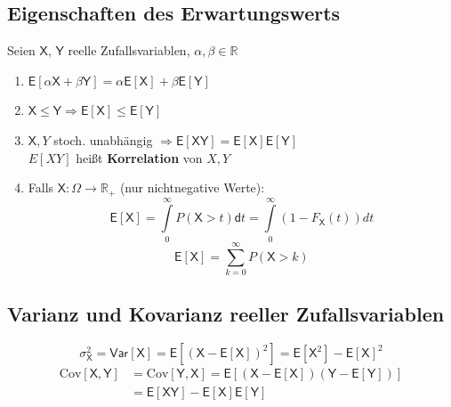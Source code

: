 \documentclass[a4paper,twocolumn,10pt]{article}
\newenvironment{iii}{\begin{enumerate}[label={\roman{*})}]}{\end{enumerate}}
\newcommand{\var}{\mathsf{Var}}
\newcommand{\erw}{\mathsf{E}}
\begin{document}
\subsection{Eigenschaften des Erwartungswerts}
Seien $\mathsf X$, $\mathsf Y$ reelle Zufallsvariablen, $\alpha, \beta \in \mathbb R$
\begin{iii}
\item $\erw[\alpha \mathsf X  + \beta \mathsf Y] = \alpha \erw[\mathsf X] + \beta \erw[\mathsf Y]$
\item $\mathsf X \leq \mathsf Y \Rightarrow \erw[\mathsf X] \leq \erw[\mathsf Y]$
\item $\mathsf X,Y$ stoch. unabhängig $\Rightarrow\erw[\mathsf X \mathsf Y] = \erw[\mathsf X]\erw[\mathsf Y]$\\
$E[XY]$ heißt \textbf{Korrelation} von $X,Y$
\item Falls $\mathsf X : \Omega \rightarrow \mathbb R_+$ (nur nichtnegative Werte):\\
\[\erw[\mathsf X] = \int\limits_{0}^{\infty} P(\mathsf X > t) \mathsf dt=\int\limits_{0}^{\infty}(1-F_{\mathsf{X}}(t))dt\]
\[\erw[\mathsf X] = \sum\limits_{k=0}^{\infty} P(\mathsf X > k)\]
\end{iii}

\subsection{Varianz und Kovarianz reeller Zufallsvariablen}
\[\sigma_{\mathsf{X}}^2=\var[\mathsf X] = \erw\left[(\mathsf X - \erw[\mathsf X])^2\right] = \erw[\mathsf X^2] - \erw[\mathsf X]^2\]
\[\begin{split}\text{Cov}[\mathsf X, \mathsf Y]&=\text{Cov}[\mathsf Y, \mathsf X] = \erw \left[ (\mathsf X - \erw[\mathsf X])(\mathsf Y - \erw[\mathsf Y])\right ] \\&= \erw[\mathsf X \mathsf Y] - \erw[\mathsf X]\erw[\mathsf Y]\end{split} \]
\end{document}
